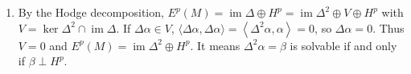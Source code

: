 \begin{enumerate}
(g) $\alpha-\sum\limits_{i=1}^{k}\langle\alpha, u_{i}\rangle u_{i} \in(H^{p})^{\perp}$, 
so there exists $\beta \in(H^{p})^{\perp}$. If $k+1 \leq j$,
\[\left\langle\alpha, u_{j}\right\rangle=\left\langle\alpha-\sum_{i=1}^{k}\langle\alpha, u_{i}\rangle u_{i}, u_{j}\right\rangle
=\langle G \beta, u_{j}\rangle=\langle\beta, G u_{j}\rangle=\frac{1}{\lambda_{j}}\langle\beta, u_{j}\rangle.\]
Thus \[\langle\alpha, u_{j}\rangle u_{j}=\frac{1}{\lambda_{j}}\langle\beta, u_{j}\rangle u_{j}=G(\langle\beta, u_{j}\rangle u_{j}).\]
Then it follows from it and the definition of $\lambda$. 
$\lambda_{n} \rightarrow \infty$ because of (c).

(h) Locally it is true, and by the compactness of $M$, 
we can find $c$ and $k$ such that it is still true globally. Then it follows from (g).
\item By the Hodge decomposition, $E^{p}(M)=\operatorname{im} \Delta \oplus H^{p}=\operatorname{im} \Delta^{2} \oplus V \oplus H^{p}$ with $V=\ker \Delta^{2} \cap \operatorname{im} \Delta$. 
If $\Delta \alpha \in V$, $\langle\Delta \alpha, \Delta \alpha\rangle=\left\langle\Delta^{2} \alpha, \alpha\right\rangle=0$, so $\Delta \alpha=0$. 
Thus $V=0$ and $E^{p}(M)=\operatorname{im} \Delta^{2} \oplus H^{p}$. 
It means $\Delta^{2} \alpha=\beta$ is solvable if and only if $\beta \perp H^{p}$.


\end{enumerate}
